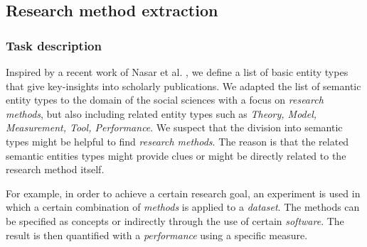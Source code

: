 \subsection{Research method extraction}
\label{sec:research_method_extraction}


\subsubsection{Task description}
Inspired by a recent work of Nasar et al. \cite{nasar2018information}, we define a list of basic entity types that give key-insights into scholarly publications. 
We adapted the list of semantic entity types to the domain of the social sciences with a focus on \textit{research methods},
but also including related entity types such as \textit{Theory, Model, Measurement, Tool, Performance}. We suspect that the division into semantic types might be helpful to find \textit{research methods}.
The reason is that the related semantic entities types might provide clues or might be directly related to the research method itself.

For example, in order to achieve a certain research goal, an experiment is used in which a certain combination of \textit{methods} is applied to a \textit{dataset}.
The methods can be specified as concepts or indirectly through the use of certain \textit{software}.
The result is then quantified with a \textit{performance} using a specific measure.

